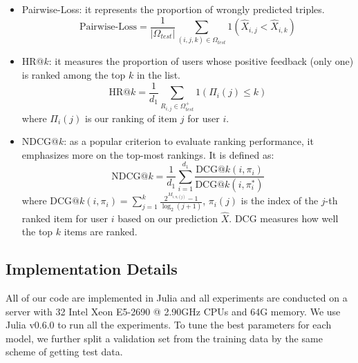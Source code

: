 \documentclass[conference]{IEEEtran}
\numberwithin{equation}{section}
\newtheorem{sampling strategy}{Sampling Strategy}
\begin{document}
\begin{itemize}
    \item Pairwise-Loss: it represents the proportion of wrongly predicted triples.
    $$ \text{Pairwise-Loss} = \frac{1}{|\Omega_{test}|} \sum_{ (i,j,k) \in \Omega_{test} } 1(\hat{X}_{i,j} < \hat{X}_{i,k}) $$
    \item HR@$k$: it measures the proportion of users whose positive feedback (only one) is ranked among the  top $k$ in  the list. 
    $$ \text{HR@}k = \frac{1}{d_1}  \underset{R_{i,j} \in \Omega_{test}^+}{\sum} 1( \Pi_i(j) \leq k ) $$
    where $\Pi_i(j)$ is our ranking of item $j$ for user $i$.
    \item NDCG@$k$: as a popular criterion to evaluate ranking performance, it emphasizes more on the top-most rankings. It is defined as:
    $$ \text{NDCG@}k = \frac{1}{d_1} \sum_{i=1}^{d_1} \frac{\text{DCG@}k(i, \pi_{i})}{\text{DCG@}k(i, \pi^*_i)} $$
    where $\displaystyle \text{DCG@}k(i,\pi_i) = \sum_{j=1}^k \frac{2^{M_{i,\pi_i(j)}} - 1}{\log_2(j+1)}$, { $\pi_i(j)$ is the index of the $j$-th ranked item for user $i$ based on our prediction $\hat{X}$. DCG measures how well the top $k$ items are ranked.} 
\end{itemize}

\subsection{Implementation Details}

All of our code are implemented in Julia and all experiments are conducted on a server with 32 Intel Xeon  E5-2690 @ 2.90GHz CPUs and 64G memory. We use Julia v0.6.0 to run all the experiments. To tune the best parameters for each model, we further split a validation set from the training data by the same scheme of getting test data. 
\end{document}
